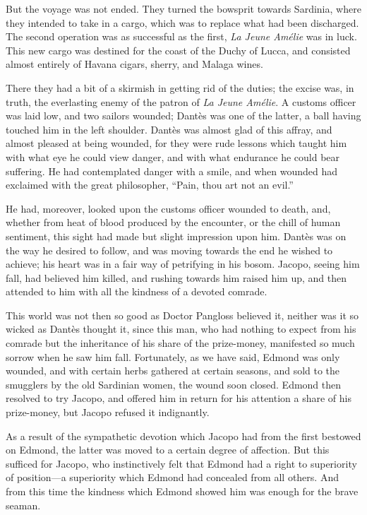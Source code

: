 But the voyage was not ended. They turned the bowsprit towards
Sardinia, where they intended to take in a cargo, which was to replace
what had been discharged. The second operation was as successful as the
first, \textit{La Jeune Amélie} was in luck. This new cargo was destined for
the coast of the Duchy of Lucca, and consisted almost entirely of
Havana cigars, sherry, and Malaga wines.

There they had a bit of a skirmish in getting rid of the duties; the
excise was, in truth, the everlasting enemy of the patron of \textit{La Jeune
Amélie}. A customs officer was laid low, and two sailors wounded;
Dantès was one of the latter, a ball having touched him in the left
shoulder. Dantès was almost glad of this affray, and almost pleased at
being wounded, for they were rude lessons which taught him with what
eye he could view danger, and with what endurance he could bear
suffering. He had contemplated danger with a smile, and when wounded
had exclaimed with the great philosopher, “Pain, thou art not an evil.”

He had, moreover, looked upon the customs officer wounded to death,
and, whether from heat of blood produced by the encounter, or the chill
of human sentiment, this sight had made but slight impression upon him.
Dantès was on the way he desired to follow, and was moving towards the
end he wished to achieve; his heart was in a fair way of petrifying in
his bosom. Jacopo, seeing him fall, had believed him killed, and
rushing towards him raised him up, and then attended to him with all
the kindness of a devoted comrade.

This world was not then so good as Doctor Pangloss believed it, neither
was it so wicked as Dantès thought it, since this man, who had nothing
to expect from his comrade but the inheritance of his share of the
prize-money, manifested so much sorrow when he saw him fall.
Fortunately, as we have said, Edmond was only wounded, and with certain
herbs gathered at certain seasons, and sold to the smugglers by the old
Sardinian women, the wound soon closed. Edmond then resolved to try
Jacopo, and offered him in return for his attention a share of his
prize-money, but Jacopo refused it indignantly.

As a result of the sympathetic devotion which Jacopo had from the first
bestowed on Edmond, the latter was moved to a certain degree of
affection. But this sufficed for Jacopo, who instinctively felt that
Edmond had a right to superiority of position—a superiority which
Edmond had concealed from all others. And from this time the kindness
which Edmond showed him was enough for the brave seaman.

